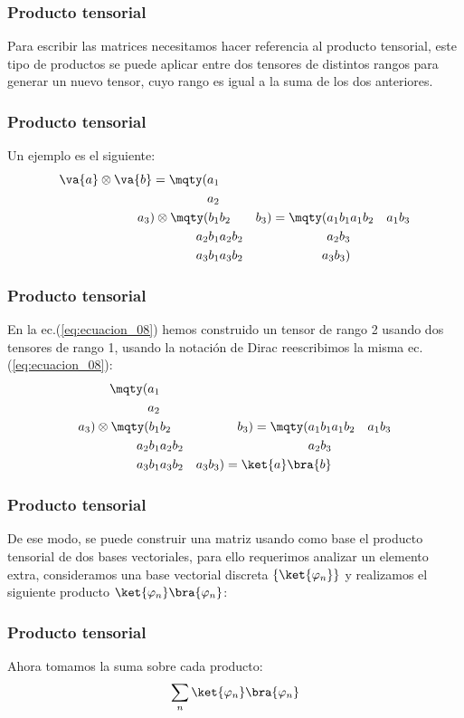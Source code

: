 \begin{frame}
\frametitle{Producto tensorial}
Para escribir las matrices necesitamos hacer referencia al producto tensorial, este tipo de productos se puede aplicar entre dos tensores de distintos rangos para generar un nuevo tensor, cuyo rango es igual a la suma de los dos anteriores.
\end{frame}
\begin{frame}
\frametitle{Producto tensorial}
Un ejemplo es el siguiente:
\fontsize{12}{12}\selectfont
\begin{align}
\va{a} \otimes \va{b} = 
\mqty(a_{1} \\ a_{2} \\ a_{3}) \otimes \mqty(b_{1} & b_{2} & b_{3}) = \mqty(
a_{1} b_{1} & a_{1} b_{2} & a_{1} b_{3} \\
a_{2} b_{1} & a_{2} b_{2} & a_{2} b_{3} \\
a_{3} b_{1} & a_{3} b_{2} & a_{3} b_{3}
)
\label{eq:ecuacion_08}
\end{align}
\end{frame}
\begin{frame}
\frametitle{Producto tensorial}
En la ec.(\ref{eq:ecuacion_08}) hemos construido un tensor de rango 2 usando dos tensores de rango 1, usando la notación de Dirac reescribimos la misma ec.(\ref{eq:ecuacion_08}):
\pause
\fontsize{12}{12}\selectfont
\begin{align}
\mqty(a_{1} \\ a_{2} \\ a_{3}) \otimes \mqty(b_{1} & b_{2} & b_{3}) = \mqty(
a_{1} b_{1} & a_{1} b_{2} & a_{1} b_{3} \\
a_{2} b_{1} & a_{2} b_{2} & a_{2} b_{3} \\
a_{3} b_{1} & a_{3} b_{2} & a_{3} b_{3}
) = \ket{a} \bra{b}
\label{eq:ecuacion_09}
\end{align}
\end{frame}
\begin{frame}
\frametitle{Producto tensorial}
De ese modo, se puede construir una matriz usando como base el producto tensorial de dos bases vectoriales, para ello requerimos analizar un elemento extra, consideramos una base vectorial discreta $\left\{ \ket{\varphi_{n}} \right\} $ y realizamos el siguiente producto $\ket{\varphi_{n}} \bra{\varphi_{n}}$:
\end{frame}
\begin{frame}
\frametitle{Producto tensorial}
Ahora tomamos la suma sobre cada producto:
\begin{align}
\sum_{n} \ket{\varphi_{n}} \bra{\varphi_{n}}
\label{eq:ecuacion_10}
\end{align}
\end{frame}
